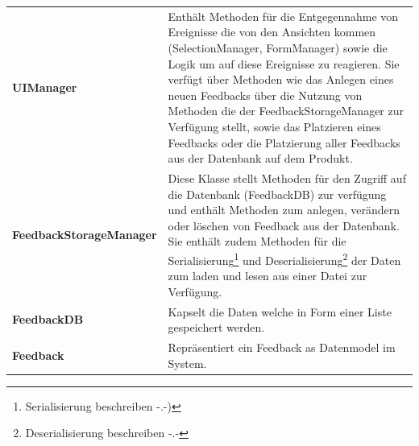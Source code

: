 \begin{tabularx}{\textwidth}{l X}
	\vspace{1mm}\textbf{UIManager} & Enthält Methoden für die Entgegennahme von Ereignisse die von den Ansichten kommen (SelectionManager, FormManager) sowie die Logik um auf diese Ereignisse zu reagieren. Sie verfügt über Methoden wie das Anlegen eines neuen Feedbacks über die Nutzung von Methoden die der FeedbackStorageManager zur Verfügung stellt, sowie das Platzieren eines Feedbacks oder die Platzierung aller Feedbacks aus der Datenbank auf dem Produkt. \\
	\vspace{1mm}\textbf{FeedbackStorageManager} & Diese Klasse stellt Methoden für den Zugriff auf die Datenbank (FeedbackDB) zur verfügung und enthält Methoden zum anlegen, verändern oder löschen von Feedback aus der Datenbank. Sie enthält zudem Methoden für die Serialisierung\footnote{Serialisierung beschreiben -.-)} und Deserialisierung\footnote{Deserialisierung beschreiben -.-} der Daten zum laden und lesen aus einer Datei zur Verfügung. \\
	\vspace{1mm}\textbf{FeedbackDB} & Kapselt die Daten welche in Form einer Liste gespeichert werden. \\
	\vspace{1mm}\textbf{Feedback} & Repräsentiert ein Feedback as Datenmodel im System.\\
\end{tabularx}


